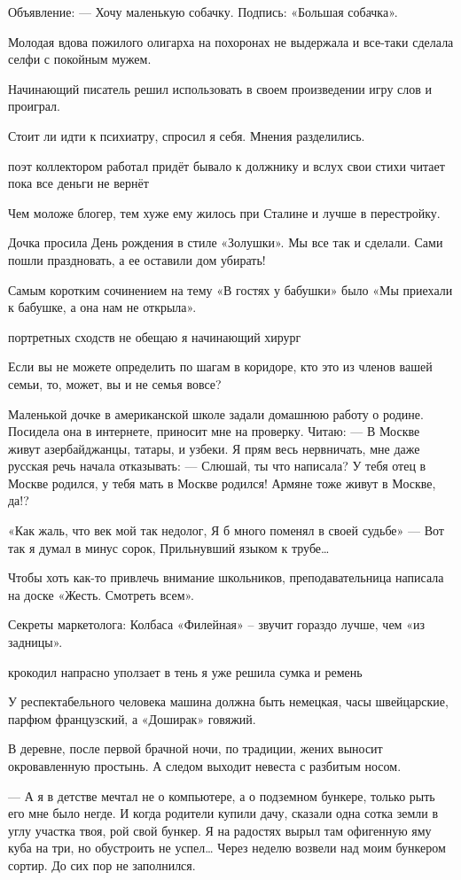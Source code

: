 Объявление:
— Хочу маленькую собачку.
Подпись: «Большая собачка».

Молодая вдова пожилого олигарха на похоронах не выдержала и все-таки сделала селфи с покойным мужем.

Начинающий писатель решил использовать в своем произведении игру слов и проиграл.

Стоит ли идти к психиатру, спросил я себя.
Мнения разделились.

поэт коллектором работал
придёт бывало к должнику
и вслух свои стихи читает
пока все деньги не вернёт

Чем моложе блогер, тем хуже ему жилось при Сталине и лучше в перестройку.

Дочка просила День рождения в стиле «Золушки». Мы все так и сделали. Сами пошли праздновать, а ее оставили дом убирать!

Самым коротким сочинением на тему «В гостях у бабушки» было «Мы приехали к бабушке, а она нам не открыла».

портретных сходств не обещаю
я начинающий хирург

Если вы не можете определить по шагам в коридоре, кто это из членов вашей семьи, то, может, вы и не семья вовсе?

Маленькой дочке в американской школе задали домашнюю работу о родине. Посидела она в интернете, приносит мне на проверку. Читаю:
— В Москве живут азербайджанцы, татары, и узбеки.
Я прям весь нервничать, мне даже русская речь начала отказывать:
— Слюшай, ты что написала? У тебя отец в Москве родился, у тебя мать в Москве родился! Армяне тоже живут в Москве, да!?

«Как жаль, что век мой так недолог,
Я б много поменял в своей судьбе» — Вот так я думал в минус сорок,
Прильнувший языком к трубе…

Чтобы хоть как-то привлечь внимание школьников, преподавательница написала на доске «Жесть. Смотреть всем».

Секреты маркетолога: Колбаса «Филейная» – звучит гораздо лучше, чем «из задницы».

крокодил напрасно
уползает в тень
я уже решила
сумка и ремень

У респектабельного человека машина должна быть немецкая, часы швейцарские, парфюм французский, а «Доширак» говяжий.

В деревне, после первой брачной ночи, по традиции, жених выносит окровавленную простынь. А следом выходит невеста с разбитым носом.

— А я в детстве мечтал не о компьютере, а о подземном бункере, только рыть его мне было негде. И когда родители купили дачу, сказали одна сотка земли в углу участка твоя, рой свой бункер. Я на радостях вырыл там офигенную яму куба на три, но обустроить не успел… Через неделю возвели над моим бункером сортир. До сих пор не заполнился.

